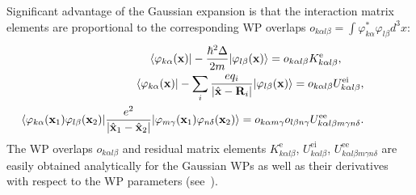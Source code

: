 \documentclass[a4paper,12pt]{article}
\begin{document}
Significant advantage of the Gaussian expansion is that the interaction matrix
elements
are proportional to the corresponding WP overlaps $o_{k\alpha
	l\beta}=\int\varphi^*_{k\alpha}\varphi^{}_{l\beta}d^3x$:
\begin{eqnarray}\label{EnergyElements}
&&\langle\varphi_{k\alpha}(\mathbf{x})|
-\frac{\hbar^2\Delta}{2m}|
\varphi_{l\beta}(\mathbf{x})\rangle
= o_{k\alpha l\beta}K^\mathrm{e}_{k\alpha l\beta},\qquad\nonumber\\
&&\langle\varphi_{k\alpha}(\mathbf{x})|
-\sum_{i}\frac{eq_i}{|\hat{\mathbf{x}}-\mathbf{R}_i|}|
\varphi_{l\beta}(\mathbf{x})\rangle
= o_{k\alpha l\beta}U^\mathrm{ei}_{k\alpha l\beta}, \nonumber\\
&&\hspace*{-40pt} \langle\varphi_{k\alpha}(\mathbf{x}_1)\varphi_{l\beta}(\mathbf{x}_2)|
\frac{e^2}{|\hat{\mathbf{x}}_1-\hat{\mathbf{x}}_2|}|
\varphi_{m\gamma}(\mathbf{x}_1)\varphi_{n\delta}(\mathbf{x}_2)\rangle
= o_{k\alpha m\gamma}o_{l\beta n\gamma}U^\mathrm{ee}_{k\alpha l\beta m\gamma n\delta}.
\end{eqnarray}
The WP overlaps $o_{k\alpha l\beta}$ and residual matrix elements
$K^\mathrm{e}_{k\alpha l\beta}$, $U^\mathrm{ei}_{k\alpha l\beta}$, $U^\mathrm{ee}_{k\alpha l\beta
	m\gamma n\delta}$ are easily obtained analytically for the Gaussian WPs as well
as their derivatives with respect to the WP parameters (see~\cite{Valuev:JPCS15}).
\end{document}
